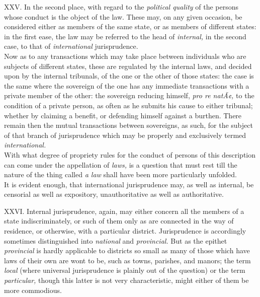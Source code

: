 \documentclass[12pt]{report}
\begin{document}
XXV. In the second place, with regard to the \emph{political quality} of
the persons whose conduct is the object of the law. These may, on any
given occasion, be considered either as members of the same state, or as
members of different states: in the first ease, the law may be referred
to the head of \emph{internal,} in the second case, to that of
\emph{international} jurisprudence.\\
Now as to any transactions which may take place between individuals who
are subjects of different states, these are regulated by the internal
laws, and decided upon by the internal tribunals, of the one or the
other of those states: the case is the same where the sovereign of the
one has any immediate transactions with a private member of the other:
the sovereign reducing himself, \emph{pro re natÃ¢,} to the condition of
a private person, as often as he submits his cause to either tribunal;
whether by claiming a benefit, or defending himself against a burthen.
There remain then the mutual transactions between sovereigns, as such,
for the subject of that branch of jurisprudence which may be properly
and exclusively termed \emph{international.} \emph{\\
}With what degree of propriety rules for the conduct of persons of this
description can come under the appellation of \emph{laws,} is a question
that must rest till the nature of the thing called \emph{a law} shall
have been more particularly unfolded.\\
It is evident enough, that international jurisprudence may, as well as
internal, be censorial as well as expository, unauthoritative as well as
authoritative.

XXVI. Internal jurisprudence, again, may either concern all the members
of a state indiscriminately, or such of them only as are connected in
the way of residence, or otherwise, with a particular district.
Jurisprudence is accordingly sometimes distinguished into
\emph{national} and \emph{provincial.} But as the epithet
\emph{provincial} is hardly applicable to districts so small as many of
those which have laws of their own are wont to be, such as towns,
parishes, and manors; the term \emph{local} (where universal
jurisprudence is plainly out of the question) or the term
\emph{particular,} though this latter is not very characteristic, might
either of them be more commodious.
\end{document}
